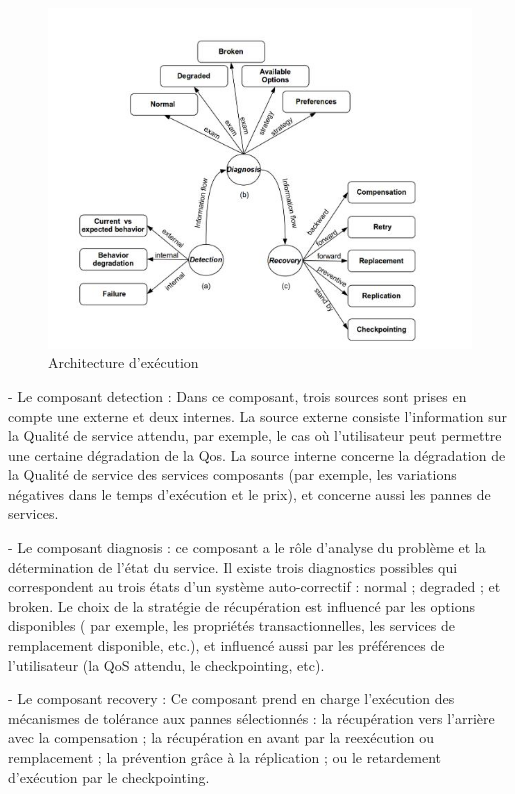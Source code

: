 \begin{figure}[H]
\begin{center}
\includegraphics[width=1\linewidth]{images/Boucle auto-corrective des Agents de Service.jpg}
\end{center}
\caption{Architecture d'exécution \cite{1}}
\label{fig:5}
\end{figure}

- Le composant detection : Dans ce composant, trois sources sont prises en compte une externe et deux internes. 
La source externe consiste l'information sur la Qualité de service attendu, par exemple, le cas où l'utilisateur peut permettre une certaine dégradation de la Qos.
La source interne concerne la dégradation de la Qualité de service des services composants (par exemple, les variations négatives dans le temps d'exécution et le prix), et concerne aussi les pannes de services.

- Le composant diagnosis : ce composant a le rôle d'analyse du problème et la détermination de l'état du service.
Il existe trois diagnostics possibles qui correspondent au trois états d'un système auto-correctif : normal ; degraded ; et broken. Le choix de la stratégie de récupération est influencé par les options disponibles ( par exemple, les propriétés transactionnelles, les services de remplacement disponible, etc.), et influencé aussi par les préférences de l'utilisateur (la QoS attendu, le checkpointing, etc).

- Le composant recovery :  Ce composant prend en charge l'exécution des mécanismes de tolérance aux pannes sélectionnés : la récupération vers l'arrière avec la compensation ; la récupération en avant par la reexécution ou remplacement ; la prévention grâce à la réplication ; ou le retardement d'exécution par le checkpointing.



